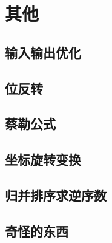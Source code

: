 \section{其他}



\subsection{输入输出优化}


\subsection{位反转}


\subsection{蔡勒公式}



\subsection{坐标旋转变换}



\subsection{归并排序求逆序数}


\subsection{奇怪的东西}

